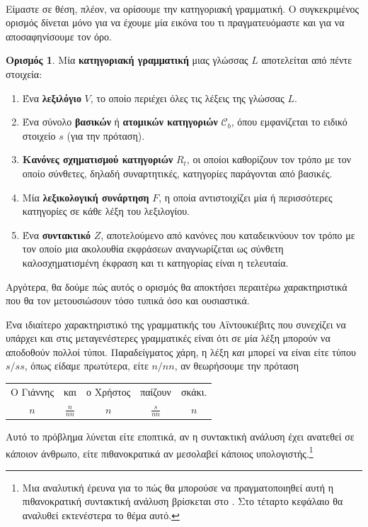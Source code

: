 \documentclass [a4paper,11pt] {book}
\theoremstyle{definition}
\theoremstyle{definition}
\newtheorem{definition}[theorem]{Ορισμός}
\newenvironment{remark}[1][Παρατήρηση]{\begin{trivlist}
\item[\hskip \labelsep {\bfseries #1}]}{\end{trivlist}}
\begin{document}
\paragraph{}
Είμαστε σε θέση, πλέον, να ορίσουμε την κατηγοριακή γραμματική. Ο συγκεκριμένος ορισμός δίνεται μόνο για να έχουμε μία εικόνα του τι πραγματευόμαστε και για να αποσαφηνίσουμε τον όρο.
\begin{definition}
\label{catGrDefinition}
Μία \textbf{κατηγοριακή γραμματική} μιας γλώσσας $L$ αποτελείται από πέντε στοιχεία:
\begin{enumerate}
\item Ένα \textbf{λεξιλόγιο} $V$, το οποίο περιέχει όλες τις λέξεις της γλώσσας $L$.
\item Ένα σύνολο \textbf{βασικών} ή \textbf{ατομικών κατηγοριών} $\mathcal{C}_{b}$, όπου εμφανίζεται το ειδικό στοιχείο $s$ (για την πρόταση).
\item \textbf{Κανόνες σχηματισμού κατηγοριών} $R_{t}$, οι οποίοι καθορίζουν τον τρόπο με τον οποίο σύνθετες, δηλαδή συναρτητικές, κατηγορίες παράγονται από βασικές.
\item Μία \textbf{λεξικολογική συνάρτηση} $F$, η οποία αντιστοιχίζει μία ή περισσότερες κατηγορίες σε κάθε λέξη του λεξιλογίου.
\item Ένα \textbf{συντακτικό} $Z$, αποτελούμενο από κανόνες που καταδεικνύουν τον τρόπο με τον οποίο μια ακολουθία εκφράσεων αναγνωρίζεται ως σύνθετη καλοσχηματισμένη έκφραση και τι κατηγορίας είναι η τελευταία.
\end{enumerate}
Αργότερα, θα δούμε πώς αυτός ο ορισμός θα αποκτήσει περαιτέρω χαρακτηριστικά που θα τον μετουσιώσουν τόσο τυπικά όσο και ουσιαστικά.
\end{definition}
\begin{remark}
Ένα ιδιαίτερο χαρακτηριστικό της γραμματικής του Αϊντουκιέβιτς που συνεχίζει να υπάρχει και στις μεταγενέστερες γραμματικές είναι ότι σε μία λέξη μπορούν να αποδοθούν πολλοί τύποι. Παραδείγματος χάρη, η λέξη \textit{και} μπορεί να είναι είτε τύπου $s/ss$, όπως είδαμε πρωτύτερα, είτε $n/nn$, αν θεωρήσουμε την πρόταση
\begin{center}
\begin{tabular}{ccccc}
Ο Γιάννης & και & ο Χρήστος & παίζουν & σκάκι. \\ 
$n$ & $\frac{n}{nn}$ & $n$ & $\frac{s}{nn}$ & $n$ \\ 
\end{tabular} 
\end{center}
Αυτό το πρόβλημα λύνεται είτε εποπτικά, αν η συντακτική ανάλυση έχει ανατεθεί σε κάποιον άνθρωπο, είτε πιθανοκρατικά αν μεσολαβεί κάποιος υπολογιστής.\footnote{Μια αναλυτική έρευνα για το πώς θα μπορούσε να πραγματοποιηθεί αυτή η πιθανοκρατική συντακτική ανάλυση βρίσκεται στο \citep{watkinson.s.manandhar.s:unsupervised1}. Στο τέταρτο κεφάλαιο θα αναλυθεί εκτενέστερα το θέμα αυτό.}
\end{remark}
\end{document}
